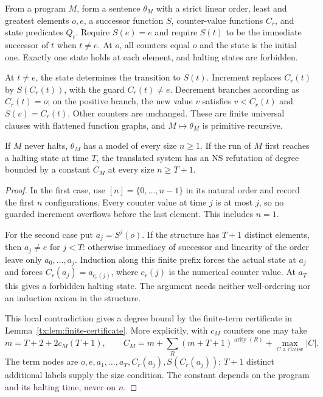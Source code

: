 From a program $M$, form a sentence $\theta_M$ with a strict linear order,
least and greatest elements $o,e$, a successor function $S$, counter-value
functions $C_r$, and state predicates $Q_\ell$. Require $S(e)=e$ and require
$S(t)$ to be the immediate successor of $t$ when $t\ne e$. At $o$, all
counters equal $o$ and the state is the initial one. Exactly one state holds
at each element, and halting states are forbidden.

At $t\ne e$, the state determines the transition to $S(t)$. Increment
replaces $C_r(t)$ by $S(C_r(t))$, with the guard $C_r(t)\ne e$.
Decrement branches according as $C_r(t)=o$; on the positive branch, the new
value $v$ satisfies $v<C_r(t)$ and $S(v)=C_r(t)$. Other counters are
unchanged. These are finite universal clauses with flattened function
graphs, and $M\mapsto\theta_M$ is primitive recursive.

\begin{lemma}\label{tx:lem:switch}
If $M$ never halts, $\theta_M$ has a model of every size $n\ge1$.
If the run of $M$ first reaches a halting state at time $T$, the translated system has an NS refutation of
degree bounded by a constant $C_M$ at every size $n\ge T+1$.
\end{lemma}
\begin{proof}
In the first case, use $[n]=\{0,\ldots,n-1\}$ in its natural order and
record the first $n$ configurations. Every counter value at time $j$ is at
most $j$, so no guarded increment overflows before the last element.
This includes $n=1$.

For the second case put $a_j=S^j(o)$. If the structure has $T+1$ distinct
elements, then $a_j\ne e$ for $j<T$: otherwise immediacy of successor and
linearity of the order leave only $a_0,\ldots,a_j$. Induction along this
finite prefix forces the actual state at $a_j$ and forces
$C_r(a_j)=a_{c_r(j)}$, where $c_r(j)$ is the numerical counter value.
At $a_T$ this gives a forbidden halting state. The argument needs neither
well-ordering nor an induction axiom in the structure.

This local contradiction gives a degree bound by the finite-term
certificate in Lemma~\ref{tx:lem:finite-certificate}. More explicitly, with $c_M$
counters one may take
\[
 m=T+2+2c_M(T+1),\qquad
 C_M=m+\sum_R(m+T+1)^{\operatorname{arity}(R)}
                  +\max_{C\text{ a clause}}|C|.
\]
The term nodes are $o,e,a_1,\ldots,a_T,C_r(a_j),S(C_r(a_j))$;
$T+1$ distinct additional labels supply the size condition. The constant
depends on the program and its halting time, never on $n$.
\end{proof}

